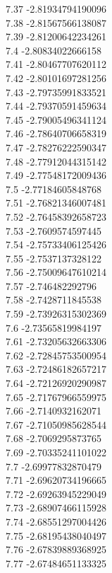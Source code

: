 {7.37	-2.81934794190096\\
7.38	-2.81567566138087\\
7.39	-2.81200642234261\\
7.4	-2.80834022666158\\
7.41	-2.80467707620112\\
7.42	-2.80101697281256\\
7.43	-2.79735991833521\\
7.44	-2.79370591459634\\
7.45	-2.79005496341124\\
7.46	-2.78640706658319\\
7.47	-2.78276222590347\\
7.48	-2.77912044315142\\
7.49	-2.77548172009436\\
7.5	-2.77184605848768\\
7.51	-2.76821346007481\\
7.52	-2.76458392658723\\
7.53	-2.7609574597445\\
7.54	-2.75733406125426\\
7.55	-2.7537137328122\\
7.56	-2.75009647610214\\
7.57	-2.746482292796\\
7.58	-2.7428711845538\\
7.59	-2.73926315302369\\
7.6	-2.73565819984197\\
7.61	-2.73205632663306\\
7.62	-2.72845753500954\\
7.63	-2.72486182657217\\
7.64	-2.72126920290987\\
7.65	-2.71767966559975\\
7.66	-2.7140932162071\\
7.67	-2.71050985628544\\
7.68	-2.7069295873765\\
7.69	-2.70335241101022\\
7.7	-2.69977832870479\\
7.71	-2.69620734196665\\
7.72	-2.69263945229049\\
7.73	-2.68907466115928\\
7.74	-2.68551297004426\\
7.75	-2.68195438040497\\
7.76	-2.67839889368925\\
7.77	-2.67484651133325\\
}
